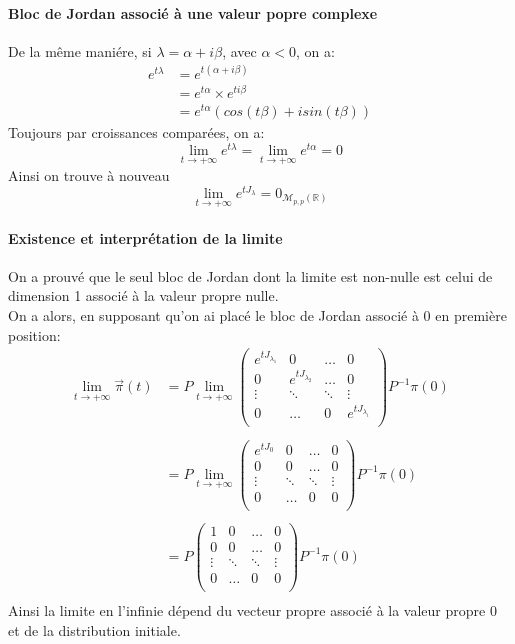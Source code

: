 \documentclass[a4paper]{article}
\theoremstyle{plain}
\theoremstyle{definition}
\theoremstyle{remark}
\begin{document}
\paragraph{Bloc de Jordan associé à une valeur popre complexe}
De la même maniére, si $\lambda =\alpha +i\beta$, avec $\alpha<0$, on a:
\begin{align*}
    e^{t\lambda}&=e^{t(\alpha +i\beta)}\\
    &=e^{t\alpha}\times e^{ti\beta}\\
    &=e^{t\alpha}\left(cos(t\beta)+isin(t\beta)\right)
\end{align*}
Toujours par croissances comparées, on a: 
$$\lim\limits_{t \rightarrow +\infty}e^{t\lambda}=\lim\limits_{t \rightarrow +\infty}e^{t\alpha}=0$$
Ainsi on trouve à nouveau
$$\lim\limits_{t \rightarrow +\infty}e^{tJ_{\lambda}}=0_{\mathcal{M}_{p,p}(\mathbb{R})}$$
\paragraph{Existence et interprétation de la limite}
On a prouvé que le seul bloc de Jordan dont la limite est non-nulle est celui de dimension 1 associé à la valeur propre nulle. \\
On a alors, en supposant qu'on ai placé le bloc de Jordan associé à 0 en première position:
\begin{align*}
\lim\limits_{t \rightarrow +\infty}\vec{\pi}(t)&=P\lim\limits_{t \rightarrow +\infty}\begin{pmatrix}
e^{tJ_{\lambda_1}}&0&\hdots&0\\
0&e^{tJ_{\lambda_2}}&\hdots&0\\
\vdots&\ddots&\ddots&\vdots\\
0&\hdots&0&e^{tJ_{\lambda_i}}\\
\end{pmatrix}P^{-1}\pi(0)\\
\\
&=P\lim\limits_{t \rightarrow +\infty}\begin{pmatrix}
e^{tJ_{0}}&0&\hdots&0\\
0&0&\hdots&0\\
\vdots&\ddots&\ddots&\vdots\\
0&\hdots&0&0\\
\end{pmatrix}P^{-1}\pi(0)\\
\\
&=P\begin{pmatrix}
1&0&\hdots&0\\
0&0&\hdots&0\\
\vdots&\ddots&\ddots&\vdots\\
0&\hdots&0&0\\
\end{pmatrix}P^{-1}\pi(0)\\
\end{align*}
Ainsi la limite en l'infinie dépend du vecteur propre associé à la valeur propre 0 et de la distribution initiale.
\newpage
\end{document}
